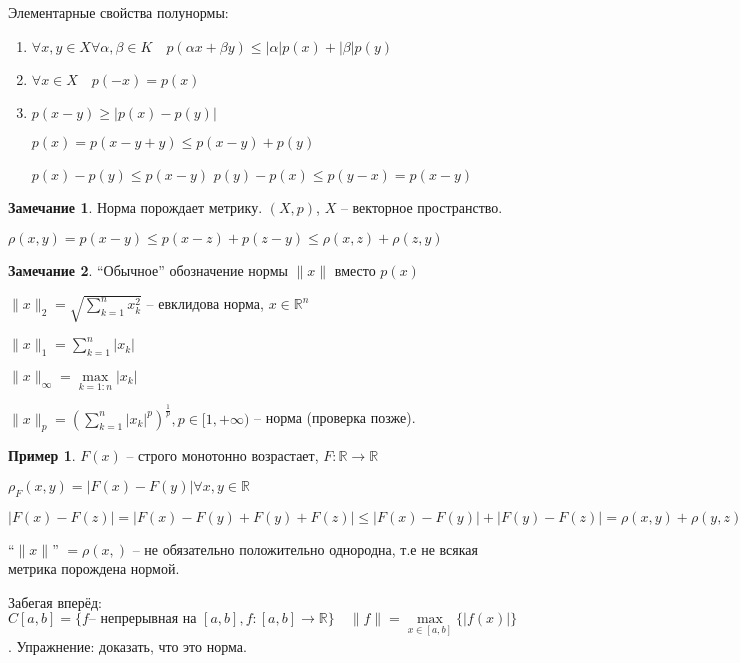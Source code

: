 \documentclass{book}
\newcommand\R{\ensuremath{\mathbb{R}}}
\theoremstyle{definition}
\newtheorem*{note}{Замечание}
\newtheorem*{example}{Пример}
\begin{document}
    Элементарные свойства полунормы:
    \begin{enumerate}
        \item $\forall  x, y\in X \forall \alpha, \beta\in K\quad p(\alpha x+\beta y) \leqslant |\alpha|p(x) + |\beta|p(y)$
        \item $\forall x\in X\quad p(-x) = p(x)$
        \item $p(x-y) \geqslant \left| p(x) - p(y) \right| $

            $p(x) = p(x-y+y) \leqslant p(x-y) + p(y)$

            $p(x) - p(y) \leqslant p(x-y)$
            $p(y) - p(x) \leqslant p(y-x) =p(x-y)$
    \end{enumerate}
    \begin{note}
        Норма порождает метрику. $(X, p)$, $X$ -- векторное пространство.

        $\rho(x, y) = p(x-y) \leqslant p(x-z) + p(z-y) \leqslant  \rho(x, z) + \rho(z, y)$
    \end{note}

    \begin{note}
        ``Обычное'' обозначение нормы $\|x\|$ вместо $p(x)$

        $\|x\|_2 = \sqrt{\sum_{k=1}^{n} x_k^2} $ -- евклидова норма, $x\in \R^n$

        $\|x\|_1 = \sum_{k=1}^{n} |x_k|$

        $\|x\|_{\infty } = \max\limits_{k=1:n} |x_k|$

        $\|x\|_p = \left( \sum_{k=1}^{n} |x_k|^p \right)^{\frac{1}{p}} , p\in [1, +\infty )$ -- норма (проверка позже).
    \end{note}
    \begin{example}
        $F(x)$ -- строго монотонно возрастает, $F:\R\to \R$

        $\rho_F(x,y) = \left| F(x) - F(y) \right| \forall x, y\in \R $

        $\left| F(x) - F(z) \right|  = \left| F(x) - F(y) + F(y) + F(z) \right| \leqslant \left| F(x)  - F(y) \right|  + |F(y) - F(z)| = \rho(x, y) + \rho(y, z)$

        ``$\|x\|$'' $ = \rho(x, )$ -- не обязательно положительно однородна, т.е не всякая метрика порождена нормой.
    \end{example}
    
    Забегая вперёд:  $C[a,b] = \{f \text{-- непрерывная на } [a,b], f:[a,b] \to  \R \}\quad \|f\| = \max\limits_{x\in [a,b]} \{|f(x)|\}$. 
    Упражнение: доказать, что это норма.
\end{document}
